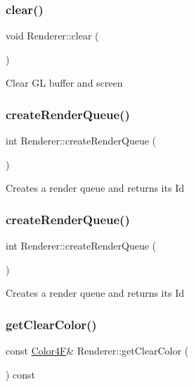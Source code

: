\subsubsection{\texorpdfstring{clear()}{clear()}\hspace{0.1cm}{\footnotesize\ttfamily [2/2]}}
{\footnotesize\ttfamily void Renderer\+::clear (\begin{DoxyParamCaption}{ }\end{DoxyParamCaption})}

Clear GL buffer and screen \mbox{\label{classRenderer_a8a199907ebd8389f15595cfbd37042df}} 
\subsubsection{\texorpdfstring{create\+Render\+Queue()}{createRenderQueue()}\hspace{0.1cm}{\footnotesize\ttfamily [1/2]}}
{\footnotesize\ttfamily int Renderer\+::create\+Render\+Queue (\begin{DoxyParamCaption}{ }\end{DoxyParamCaption})}

Creates a render queue and returns its Id \mbox{\label{classRenderer_a8a199907ebd8389f15595cfbd37042df}} 
\subsubsection{\texorpdfstring{create\+Render\+Queue()}{createRenderQueue()}\hspace{0.1cm}{\footnotesize\ttfamily [2/2]}}
{\footnotesize\ttfamily int Renderer\+::create\+Render\+Queue (\begin{DoxyParamCaption}{ }\end{DoxyParamCaption})}

Creates a render queue and returns its Id \mbox{\label{classRenderer_a3d8ae93f3fe70fd6f76d9f9a951d2161}} 
\subsubsection{\texorpdfstring{get\+Clear\+Color()}{getClearColor()}}
{\footnotesize\ttfamily const \hyperlink{structColor4F}{Color4F}\& Renderer\+::get\+Clear\+Color (\begin{DoxyParamCaption}{ }\end{DoxyParamCaption}) const\hspace{0.3cm}{\ttfamily [inline]}}

